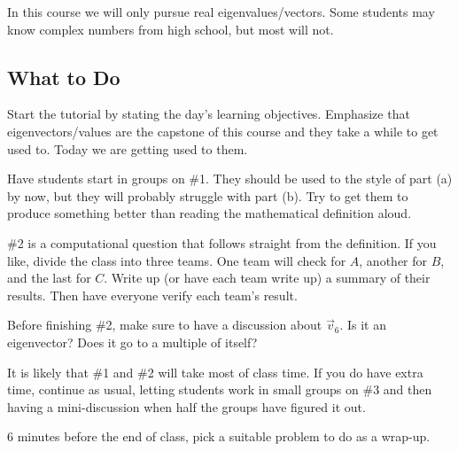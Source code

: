 \documentclass[red]{tutorial}
\theoremstyle{definition}
\theoremstyle{theorem}
\begin{document}
{\begin{instructions}
  In this course we will only pursue real eigenvalues/vectors. Some students may know complex
  numbers from high school, but most will not.


  \subsection*{What to Do}
  Start the tutorial by stating the day's learning objectives. Emphasize that eigenvectors/values
  are the capstone of this course and they take a while to get used to. Today we are getting used
  to them.

  Have students start in groups on \#1. They should be used to the style of part (a) by now,
  but they will probably struggle with part (b). Try to get them to produce something better than
  reading the mathematical definition aloud.

  \#2 is a computational question that follows straight from the definition. If you like,
  divide the class into three teams.
  One team will check for $A$, another for $B$, and the last for $C$. Write up (or have each
  team write up) a summary of their results. Then have everyone verify each team's result.

  Before finishing \#2, make sure to have a discussion about $\vec v_6$. Is it an eigenvector?
  Does it go to a multiple of itself?

  It is likely that \#1 and \#2 will take most of class time. If you do have extra time, continue as usual,
  letting students work in small groups on \#3 and then having a mini-discussion when half the groups
  have figured it out.

  6 minutes before the end of class, pick a suitable problem to do as a wrap-up.



\end{instructions}}
\end{document}
